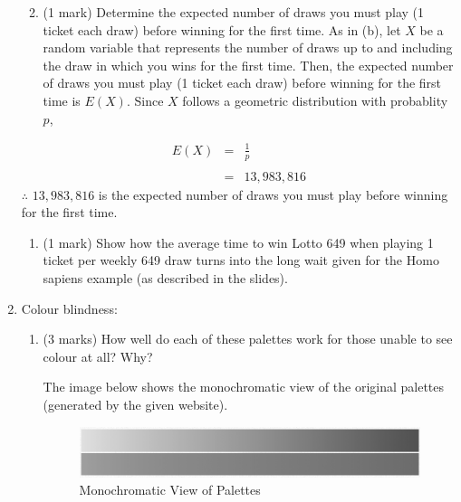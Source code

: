 \documentclass[9pt,letter]{article}
\providecommand{\tightlist}{%
  \setlength{\itemsep}{0pt}\setlength{\parskip}{0pt}}
\begin{document}
\begin{enumerate}
  \begin{enumerate}
  \def\labelenumii{(\alph{enumii})}
  \setcounter{enumii}{2}
  \tightlist
  \item
    (1 mark) Determine the expected number of draws you must play (1
    ticket each draw) before winning for the first time. As in (b), let
    \(X\) be a random variable that represents the number of draws up to
    and including the draw in which you wins for the first time. Then,
    the expected number of draws you must play (1 ticket each draw)
    before winning for the first time is \(E(X)\). Since \(X\) follows a
    geometric distribution with probablity \(p\),
  \end{enumerate}

  \[
  \begin{array}{rcl}
  E(X) & = & \frac{1}{p}\\
  \\
  & = & 13,983,816
  \end{array}
  \] \(\therefore\) \textbf{$13,983,816$} is the expected number of
  draws you must play before winning for the first time.

  \begin{enumerate}
  \def\labelenumii{(\alph{enumii})}
  \setcounter{enumii}{3}
  \tightlist
  \item
    (1 mark) Show how the average time to win Lotto 649 when playing 1
    ticket per weekly 649 draw turns into the long wait given for the
    Homo sapiens example (as described in the slides).
  \end{enumerate}
\item
  Colour blindness:

  \begin{enumerate}
  \def\labelenumii{\alph{enumii}.}
  \item
    (3 marks) How well do each of these palettes work for those unable
    to see colour at all? Why?

    The image below shows the monochromatic view of the original
    palettes (generated by the given website).

    \begin{figure}[h]
      \centering
        \includegraphics{./img/no_colour}
        \caption{Monochromatic View of Palettes}
    \end{figure}


\end{enumerate}
\end{enumerate}
\end{document}
